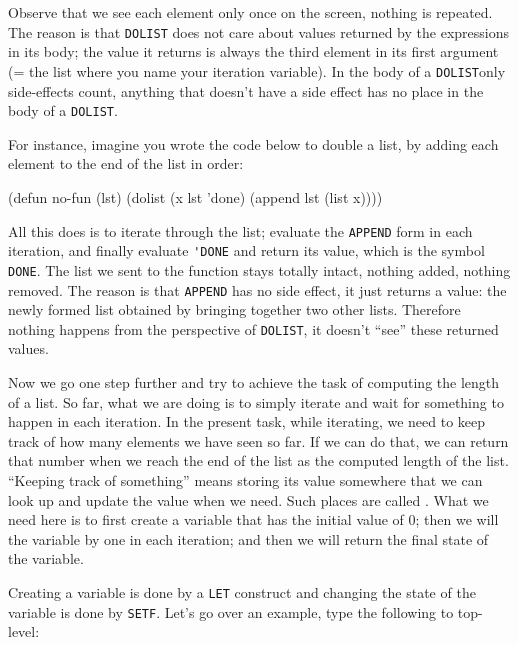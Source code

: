 \documentclass[a4paper,11pt]{article}
\begin{document}
\begin{uenum}
\begin{uenumi}
\item Observe that we see each element only once on the screen, nothing is repeated. The reason is that \Verb+DOLIST+ does not care about values returned by the expressions in its body; the value it returns is always the third element in its first argument (= the list where you name your iteration variable). In the body of a \Verb+DOLIST+only side-effects count, anything that doesn't have a side effect has no place in the body of a \Verb+DOLIST+.  

\item For instance, imagine you wrote the code below to double a list, by adding each element to the end of the list in order:  

\begin{lispcode}
(defun no-fun (lst)
  (dolist (x lst 'done)
	(append lst (list x))))
\end{lispcode}
\end{uenumi}

All this does is to iterate through the list; evaluate the \Verb+APPEND+ form in each iteration, and finally evaluate \Verb+'DONE+ and return its value, which is the symbol \Verb+DONE+. The list we sent to the function stays totally intact, nothing added, nothing removed. The reason is that \Verb+APPEND+ has no side effect, it just returns a value: the newly formed list obtained by bringing together two other lists. Therefore nothing happens from the perspective of \Verb+DOLIST+, it doesn't ``see'' these returned values.

\item Now we go one step further and try to achieve the task of computing the length of a list. So far, what we are doing is to simply iterate and wait for something to happen in each iteration. In the present task, while iterating, we need to keep track of how many elements we have seen so far. If we can do that, we can return that number when we reach the end of the list as the computed length of the list. ``Keeping track of something'' means storing its value somewhere that we can look up and update the value when we need. Such places are called . What we need here is to first create a variable that has the initial value of 0; then we will  the variable by one in each iteration; and then we will return the final state of the variable. 

\item
Creating a variable is done by a \Verb+LET+ construct and changing the state of the variable is done by \Verb+SETF+. Let's go over an example, type the following to top-level: 


\end{uenum}
\end{document}
